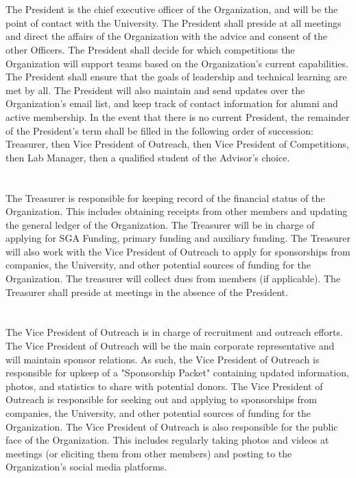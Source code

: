 \documentclass[12pt]{cls/constitution}
\begin{document}
\section{}
The President is the chief executive officer of the Organization, and will be the point of contact with the University. The President shall preside at all meetings and direct the affairs of the Organization with the advice and consent of the other Officers. The President shall decide for which competitions the Organization will support teams based on the Organization's current capabilities. The President shall ensure that the goals of leadership and technical learning are met by all. The President will also maintain and send updates over the Organization's email list, and keep track of contact information for alumni and active membership. In the event that there is no current President, the remainder of the President’s term shall be filled in the following order of succession:  Treasurer, then Vice President of Outreach, then Vice President of Competitions, then Lab Manager, then a qualified student of the Advisor’s choice. 

\section{}
The Treasurer is responsible for keeping record of the financial status of the Organization. This includes obtaining receipts from other members and updating the general ledger of the Organization. The Treasurer will be in charge of applying for SGA Funding, primary funding and auxiliary funding. The Treasurer will also work with the Vice President of Outreach to apply for sponsorships from companies, the University, and other potential sources of funding for the Organization. The treasurer will collect dues from members (if applicable). The Treasurer shall preside at meetings in the absence of the President.

\section{}
The Vice President of Outreach is in charge of recruitment and outreach efforts. The Vice President of Outreach will be the main corporate representative and will maintain sponsor relations. As such, the Vice President of Outreach is responsible for upkeep of a "Sponsorship Packet" containing updated information, photos, and statistics to share with potential donors. The Vice President of Outreach is responsible for seeking out and applying to sponsorships from companies, the University, and other potential sources of funding for the Organization. The Vice President of Outreach is also responsible for the public face of the Organization. This includes regularly taking photos and videos at meetings (or eliciting them from other members) and posting to the Organization's social media platforms. 
\end{document}
